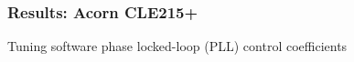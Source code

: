 \documentclass[compress,10pt,aspectratio=169]{beamer}
\begin{document}
\begin{frame}[fragile]\frametitle{Results: Acorn CLE215+}

Tuning software phase locked-loop (PLL) control coefficients

\begin{minipage}[t]{1.06\linewidth}
\begin{minipage}{.49\linewidth}
\end{minipage}
\end{minipage}
\end{frame}
\end{document}
